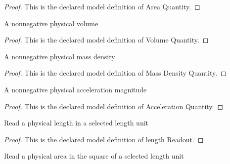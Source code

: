 \begin{proof}
  This is the declared model definition of Area Quantity.
\end{proof}
\begin{definition}
  \label{def:physics:phyx-mini-0364:phyxminiproblems-problemphyxmini0364-volumequantity}
  A nonnegative physical volume
\end{definition}
\begin{proof}
  This is the declared model definition of Volume Quantity.
\end{proof}
\begin{definition}
  \label{def:physics:phyx-mini-0364:phyxminiproblems-problemphyxmini0364-massdensityquantity}
  A nonnegative physical mass density
\end{definition}
\begin{proof}
  This is the declared model definition of Mass Density Quantity.
\end{proof}
\begin{definition}
  \label{def:physics:phyx-mini-0364:phyxminiproblems-problemphyxmini0364-accelerationquantity}
  A nonnegative physical acceleration magnitude
\end{definition}
\begin{proof}
  This is the declared model definition of Acceleration Quantity.
\end{proof}
\begin{definition}
  \label{def:physics:phyx-mini-0364:phyxminiproblems-problemphyxmini0364-lengthreadout}
  Read a physical length in a selected length unit
\end{definition}
\begin{proof}
  This is the declared model definition of length Readout.
\end{proof}
\begin{definition}
  \label{def:physics:phyx-mini-0364:phyxminiproblems-problemphyxmini0364-areareadout}
  Read a physical area in the square of a selected length unit
\end{definition}
